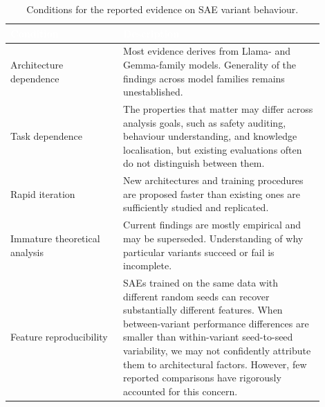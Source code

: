 \begin{table}[tb]
\centering
\caption{Conditions for the reported evidence on SAE variant behaviour.}
\label{tab:sae_limitations}
\renewcommand{\arraystretch}{1.3}
\begin{tabular}{>{\raggedright\arraybackslash}p{0.32\linewidth} >{\raggedright\arraybackslash}p{0.58\linewidth}}
\toprule
\rowcolor{tableheader!80} \textcolor{white}{\textbf{Condition}} & \textcolor{white}{\textbf{Description}} \\
\midrule
\rowcolor{tablerow1} Architecture dependence & Most evidence derives from Llama- and Gemma-family models. Generality of the findings across model families remains unestablished. \\
\rowcolor{tablerow2} Task dependence & The properties that matter may differ across analysis goals, such as safety auditing, behaviour understanding, and knowledge localisation, but existing evaluations often do not distinguish between them.\\
\rowcolor{tablerow1} Rapid iteration & New architectures and training procedures are proposed faster than existing ones are sufficiently studied and replicated. \\
\rowcolor{tablerow2} Immature theoretical analysis & Current findings are mostly empirical and may be superseded. Understanding of why particular variants succeed or fail is incomplete. \\

\rowcolor{tablerow1} Feature reproducibility & SAEs trained on the same data with different random seeds can recover substantially different features. When between-variant performance differences are smaller than within-variant seed-to-seed variability, we may not confidently attribute them to architectural factors. However, few reported comparisons have rigorously accounted for this concern. \\

\bottomrule
\end{tabular}
\end{table}



































